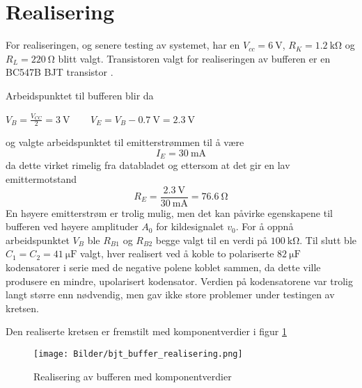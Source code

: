 \section{Realisering}
\label{realisering}

For realiseringen, og senere testing av systemet, har en $V_{cc} = \SI{6}{\volt}$, 
$R_K = \SI{1.2}{\kilo\ohm}$ og $R_L = \SI{220}{\ohm}$ blitt valgt. Transistoren valgt for 
realiseringen av bufferen er en BC547B BJT transistor \cite{bjt}.

Arbeidspunktet til bufferen blir da 
\begin{center}
    $V_B = \frac{V_{CC}}{2} = \SI{3}{\volt}\:\:\:\:$ $\:\:\:\:V_E = V_B - \SI{0.7}{\volt} = \SI{2.3}{\volt}$
\end{center}
og valgte arbeidspunktet til emitterstrømmen til å være 
\[
    I_E = \SI{30}{\milli\ampere}
\]
da dette virket rimelig fra databladet og ettersom at det gir en lav emittermotstand
\[
    R_E = \frac{\SI{2.3}{\volt}}{\SI{30}{\milli\ampere}} = \SI{76.6}{\ohm}
\]
En høyere emitterstrøm er trolig mulig, men det kan påvirke egenskapene til bufferen ved høyere 
amplituder $A_0$ for kildesignalet $v_0$.
For å oppnå arbeidspunktet $V_B$ ble $R_{B1}$ og $R_{B2}$ begge valgt til en verdi på $\SI{100}{\kilo\ohm}$.
Til slutt ble $C_1 = C_2 = \SI{41}{\micro\farad}$ valgt, hver realisert ved å koble to 
polariserte $\SI{82}{\micro\farad}$ kodensatorer i serie med de negative polene koblet sammen, da dette 
ville produsere en mindre, upolarisert kodensator. Verdien på kodensatorene var trolig langt større enn 
nødvendig, men gav ikke store problemer under testingen av kretsen.

Den realiserte kretsen er fremstilt med komponentverdier i figur \ref{fig:buffer_realisering}

\begin{figure}[H]
    \centering
    \texttt{[image: Bilder/bjt\_buffer\_realisering.png]}
    \caption{Realisering av bufferen med komponentverdier}
    \label{fig:buffer_realisering}
\end{figure}
